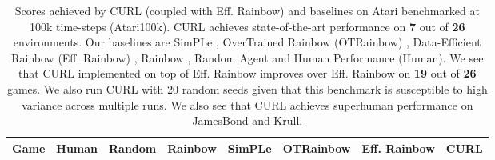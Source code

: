 \begin{table}[h!]
\caption{Scores achieved by CURL (coupled with Eff. Rainbow) and baselines on Atari benchmarked at 100k time-steps (Atari100k). CURL achieves state-of-the-art performance on {\textbf{7}} out of {\textbf{26}} environments. Our baselines are SimPLe \cite{kaiser2019model}, OverTrained Rainbow (OTRainbow) \cite{kielak2020rainbow}, Data-Efficient Rainbow (Eff. Rainbow) \cite{van2019use}, Rainbow \cite{hessel2017rainbow}, Random Agent and Human Performance (Human). We see that CURL implemented on top of Eff. Rainbow improves over Eff. Rainbow on {\bf 19} out of {\bf 26} games. We also run CURL with 20 random seeds given that this benchmark is susceptible to high variance across multiple runs. We also see that CURL achieves superhuman performance on JamesBond and Krull.}

\label{table:100katariscores}
\vskip 0.15in
\begin{center}
\begin{small}
\begin{sc}
\begin{tabular}{lccccccc}
\toprule
Game & Human & Random  & Rainbow & SimPLe & OTRainbow & Eff. Rainbow  & CURL \\
\midrule


\end{tabular}
\end{sc}
\end{small}
\end{center}
\end{table}
